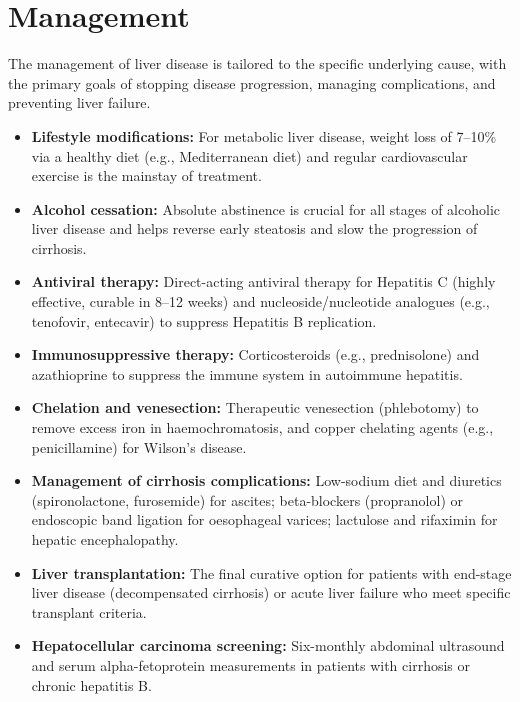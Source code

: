 \section*{Management}
The management of liver disease is tailored to the specific underlying cause, with the primary goals of stopping disease progression, managing complications, and preventing liver failure.
\begin{itemize}
    \item \textbf{Lifestyle modifications:} For metabolic liver disease, weight loss of 7--10\% via a healthy diet (e.g., Mediterranean diet) and regular cardiovascular exercise is the mainstay of treatment.
    \item \textbf{Alcohol cessation:} Absolute abstinence is crucial for all stages of alcoholic liver disease and helps reverse early steatosis and slow the progression of cirrhosis.
    \item \textbf{Antiviral therapy:} Direct-acting antiviral therapy for Hepatitis C (highly effective, curable in 8--12 weeks) and nucleoside/nucleotide analogues (e.g., tenofovir, entecavir) to suppress Hepatitis B replication.
    \item \textbf{Immunosuppressive therapy:} Corticosteroids (e.g., prednisolone) and azathioprine to suppress the immune system in autoimmune hepatitis.
    \item \textbf{Chelation and venesection:} Therapeutic venesection (phlebotomy) to remove excess iron in haemochromatosis, and copper chelating agents (e.g., penicillamine) for Wilson's disease.
    \item \textbf{Management of cirrhosis complications:} Low-sodium diet and diuretics (spironolactone, furosemide) for ascites; beta-blockers (propranolol) or endoscopic band ligation for oesophageal varices; lactulose and rifaximin for hepatic encephalopathy.
    \item \textbf{Liver transplantation:} The final curative option for patients with end-stage liver disease (decompensated cirrhosis) or acute liver failure who meet specific transplant criteria.
    \item \textbf{Hepatocellular carcinoma screening:} Six-monthly abdominal ultrasound and serum alpha-fetoprotein measurements in patients with cirrhosis or chronic hepatitis B.
\end{itemize}

